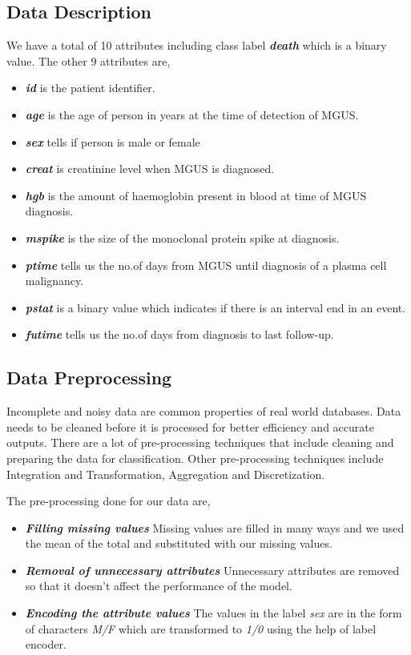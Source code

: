 \documentclass[conference]{IEEEtran}
\begin{document}
\subsection{Data Description}
\label{ssec:describe}
We have a total of 10 attributes including class label \textbf{\textit{death}} which is a binary value. The other 9 attributes are,  

\begin{itemize}
\item \textbf{\textit{id}} is the patient identifier.
\item \textbf{\textit{age}} is the age of person in years at the time of detection of MGUS. 
\item \textbf{\textit{sex}} tells if person is male or female
\item \textbf{\textit{creat}} is creatinine level when MGUS is diagnosed.
\item \textbf{\textit{hgb}} is the amount of haemoglobin present in blood at time of MGUS diagnosis.
\item \textbf{\textit{mspike}} is the size of the monoclonal protein spike at diagnosis.
\item \textbf{\textit{ptime}} tells us the no.of days from MGUS until diagnosis of a plasma cell malignancy.
\item \textbf{\textit{pstat}} is a binary value which indicates if there is an interval end in an event.
\item \textbf{\textit{futime}} tells us the no.of days from diagnosis to last follow-up.
\end{itemize}


\subsection{Data Preprocessing}
\label{ssec:preprocess}
Incomplete and noisy data are common properties of real world databases. Data needs to be cleaned before it is processed for better efficiency and accurate outputs. There are a lot of pre-processing techniques that include cleaning and preparing the data for classification. Other pre-processing techniques include Integration and Transformation, Aggregation and Discretization.

The pre-processing done for our data are,
\begin{itemize}
\item \textbf{\textit{Filling missing values}} Missing values are filled in many ways and we used the mean of the total and substituted with our missing values. 
\item \textbf{\textit{Removal of unnecessary attributes}} Unnecessary attributes are removed so that it doesn't affect the performance of the model.
\item \textbf{\textit{Encoding the attribute values}} The values in the label \textit{sex} are in the form of characters \textit{M/F} which are transformed to \textit{1/0} using the help of label encoder.
\end{itemize} 
\end{document}
